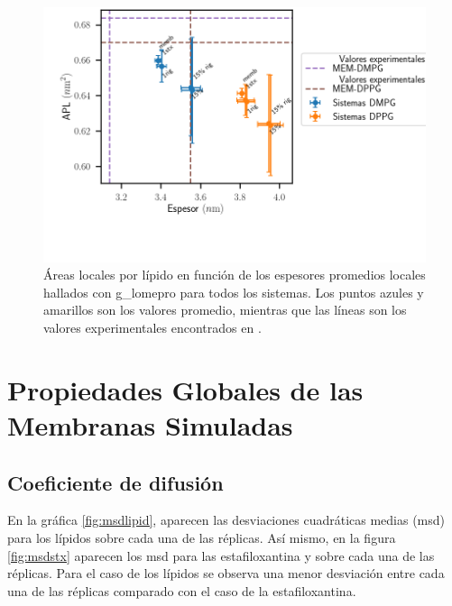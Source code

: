 \begin{figure}
\begin{center}
    \includegraphics[scale=0.3,trim={0 3cm 0 0cm},clip]{Plots/apl_thickness.png}
  \caption{\'{A}reas locales por l\'{i}pido en funci\'{o}n de los espesores promedios locales hallados con g\_lomepro para todos los sistemas. Los puntos azules y amarillos son los valores promedio, mientras que las l\'{i}neas son los valores experimentales encontrados en \cite{Pan2012}. }
  \label{fig:aplthickglomepro}
\end{center}
\end{figure}

\section{Propiedades Globales de las Membranas Simuladas}
\subsection{Coeficiente de difusi\'{o}n}

En la gr\'{a}fica \ref{fig:msdlipid}, aparecen las desviaciones cuadr\'{a}ticas medias (msd) para los l\'{i}pidos sobre cada una de las r\'{e}plicas. As\'{i} mismo, en la figura \ref{fig:msdstx} aparecen los msd para las estafiloxantina y sobre cada una de las r\'{e}plicas. Para el caso de los l\'{i}pidos se observa una menor desviaci\'{o}n entre cada una de las r\'{e}plicas comparado con el caso de la estafiloxantina.\\ 

